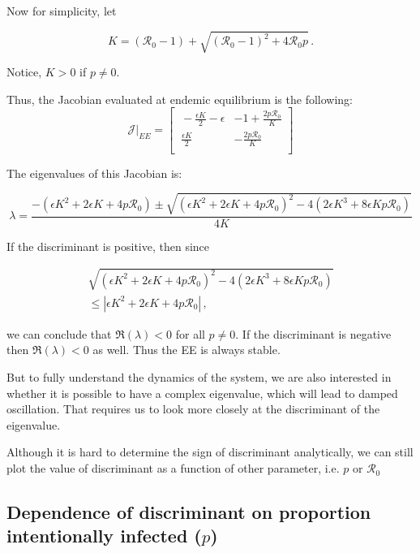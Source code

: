 \documentclass[12pt]{article}
\newcommand{\R}{\mathcal{R}}
\begin{document}
Now for simplicity, let 
%
\begin{linenomath*}
\begin{equation}\label{E:}
K = (\R_0 -1)+ \sqrt{(\R_0-1)^2+4\R_0 p} \,.
\end{equation}
\end{linenomath*}
%
Notice, $K>0$ if $p\neq 0$.

Thus, the Jacobian evaluated at endemic equilibrium is the following:
\begin{equation}
\mathcal{J}|_{EE} =
\begin{bmatrix}
    \ -\frac{\epsilon K}{2}-\epsilon       & -1+\frac{2p \R_0}{K} \\
    \ \frac{\epsilon K}{2}       & -\frac{2p \R_0}{K} \\
\end{bmatrix}
\end{equation}

The eigenvalues of this Jacobian is:

\begin{equation}
\lambda = \frac{-(\epsilon K^2+2\epsilon K +4p\mathcal{R}_0) \pm \sqrt{(\epsilon K^2+2\epsilon K +4p\mathcal{R}_0)^2-4(2\epsilon K^3+8\epsilon Kp\mathcal{R}_0)}}{4K}
\end{equation}

If the discriminant is positive, then since
%
\begin{linenomath*}
\begin{multline}\label{}
\sqrt{(\epsilon K^2+2\epsilon K +4p\mathcal{R}_0)^2-4(2\epsilon
  K^3+8\epsilon Kp\mathcal{R}_0)} \\
 \leq \left|\epsilon K^2+2\epsilon K +4p\mathcal{R}_0\right|  \,,
\end{multline}
\end{linenomath*}
%
we can conclude that $\Re(\lambda)<0$ for all $p\neq 0$. If the discriminant is negative then $\Re(\lambda)<0$ as well.  Thus the EE is always stable.

But to fully understand the dynamics of the system, we are also interested in whether it is possible to have a complex eigenvalue, which will lead to damped oscillation. That requires us to look more closely at the discriminant of the eigenvalue.

Although it is hard to determine the sign of discriminant analytically, we can still plot the value of discriminant as a function of other parameter, i.e. $p$ or $\R_0$

\subsection{Dependence of discriminant on proportion intentionally infected ($p$)}
\end{document}
